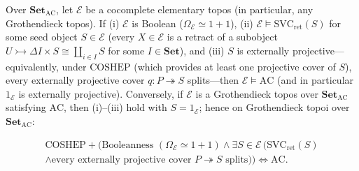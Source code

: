 \begin{theorem}\label{thm:coshep-svc}%
%

Over $\mathbf{Set}_{\mathrm{AC}}$, let $\mathcal{E}$ be a cocomplete elementary topos (in particular, any Grothendieck topos). If \textup{(i)} $\mathcal{E}$ is Boolean ($\Omega_{\mathcal{E}} \simeq 1+1$), \textup{(ii)} $\mathcal{E} \models \mathrm{SVC}_{\mathrm{ret}}(S)$ for some seed object $S \in \mathcal{E}$ (every $X \in \mathcal{E}$ is a retract of a subobject $U \rightarrowtail \Delta I \times S \cong \coprod_{i \in I} S$ for some $I \in \mathbf{Set}$), and \textup{(iii)} $S$ is externally projective---equivalently, under $\mathrm{COSHEP}$ (which provides at least one projective cover of $S$), every externally projective cover $q : P \twoheadrightarrow S$ splits---then $\mathcal{E} \models \mathrm{AC}$ (and in particular $1_{\mathcal{E}}$ is externally projective). Conversely, if $\mathcal{E}$ is a Grothendieck topos over $\mathbf{Set}_{\mathrm{AC}}$ satisfying $\mathrm{AC}$, then \textup{(i)}--\textup{(iii)} hold with $S = 1_{\mathcal{E}}$; hence on Grothendieck topoi over $\mathbf{Set}_{\mathrm{AC}}$:

\[
  \begin{gathered}
    \mathrm{COSHEP} + \bigl(\text{Booleanness } (\Omega_{\mathcal{E}} \simeq 1+1) \wedge \exists S \in \mathcal{E}\,\bigl(\mathrm{SVC}_{\mathrm{ret}}(S) \\
    \wedge \text{every externally projective cover } P \twoheadrightarrow S \text{ splits}\bigr)\bigr) \iff \mathrm{AC}.
  \end{gathered}
\]

\end{theorem}

